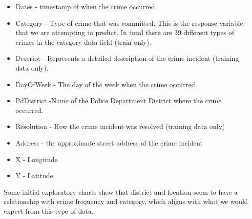 \documentclass[11pt]{article}
\begin{document}
 
\begin{itemize}
\item Dates -  timestamp of when the crime occurred
\item Category - Type of crime that was committed. This is the response variable that we are attempting to predict. In total there are 39 different types of crimes in the category data field (train only).
\item Descript - Represents a detailed description of the crime incident (training data only).
\item DayOfWeek  - The day of the week when the crime occurred.
\item PdDistrict -Name of the Police Department District where the crime occurred.
\item Resolution - How the crime incident was resolved (training data only)
\item Address - the approximate street address of the crime incident 
\item X - Longitude
\item Y - Latitude
\end{itemize}

Some initial exploratory charts show that district and location seem to have a relationship with crime frequency and category, which aligns with what we would expect from this type of data.
\end{document}

